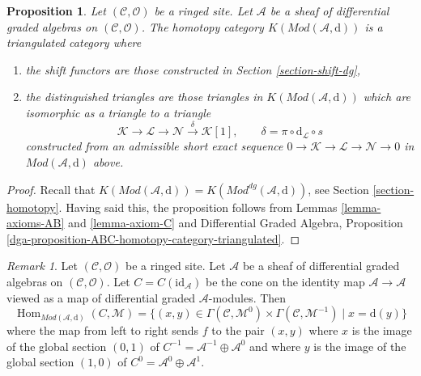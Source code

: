 \documentclass{stacks-project}
\theoremstyle{plain}
\newtheorem{proposition}[subsection]{Proposition}
\theoremstyle{definition}
\theoremstyle{remark}
\newtheorem{remark}[subsection]{Remark}
\numberwithin{equation}{subsection}
\def\Hom{\mathop{\mathrm{Hom}}\nolimits}
\begin{document}
\begin{proposition}
\label{proposition-homotopy-category-triangulated}
Let $(\mathcal{C}, \mathcal{O})$ be a ringed site.
Let $\mathcal{A}$ be a sheaf of differential graded algebras
on $(\mathcal{C}, \mathcal{O})$.
The homotopy category $K(\textit{Mod}(\mathcal{A}, \text{d}))$
is a triangulated category where
\begin{enumerate}
\item the shift functors are those constructed in
Section \ref{section-shift-dg},
\item the distinguished triangles are those triangles
in $K(\textit{Mod}(\mathcal{A}, \text{d}))$ which are
isomorphic as a triangle to a triangle
$$
\mathcal{K} \to \mathcal{L} \to \mathcal{N}
\xrightarrow{\delta} \mathcal{K}[1],\quad\quad
\delta = \pi \circ \text{d}_\mathcal{L} \circ s
$$
constructed from an admissible short exact sequence
$0 \to \mathcal{K} \to \mathcal{L} \to \mathcal{N} \to 0$
in $\textit{Mod}(\mathcal{A}, \text{d})$ above.
\end{enumerate}
\end{proposition}

\begin{proof}
Recall that $K(\textit{Mod}(\mathcal{A}, \text{d})) =
K(\textit{Mod}^{dg}(\mathcal{A}, \text{d}))$, see
Section \ref{section-homotopy}.
Having said this, the proposition
follows from Lemmas \ref{lemma-axioms-AB} and \ref{lemma-axiom-C}
and
Differential Graded Algebra, Proposition
\ref{dga-proposition-ABC-homotopy-category-triangulated}.
\end{proof}

\begin{remark}
\label{remark-cone-identity}
Let $(\mathcal{C}, \mathcal{O})$ be a ringed site.
Let $\mathcal{A}$ be a sheaf of differential graded algebras
on $(\mathcal{C}, \mathcal{O})$. Let $C = C(\text{id}_\mathcal{A})$
be the cone on the identity map $\mathcal{A} \to \mathcal{A}$ viewed
as a map of differential graded $\mathcal{A}$-modules.
Then
$$
\Hom_{\textit{Mod}(\mathcal{A}, \text{d})}(C, \mathcal{M}) =
\{(x, y) \in
\Gamma(\mathcal{C}, \mathcal{M}^0) \times
\Gamma(\mathcal{C}, \mathcal{M}^{-1}) \mid
x = \text{d}(y)\}
$$
where the map from left to right sends $f$ to the pair $(x, y)$
where $x$ is the image of the global section $(0, 1)$ of
$C^{-1} = \mathcal{A}^{-1} \oplus \mathcal{A}^0$ and where
$y$ is the image of the global section $(1, 0)$ of
$C^0 = \mathcal{A}^0 \oplus \mathcal{A}^1$.
\end{remark}
\end{document}

